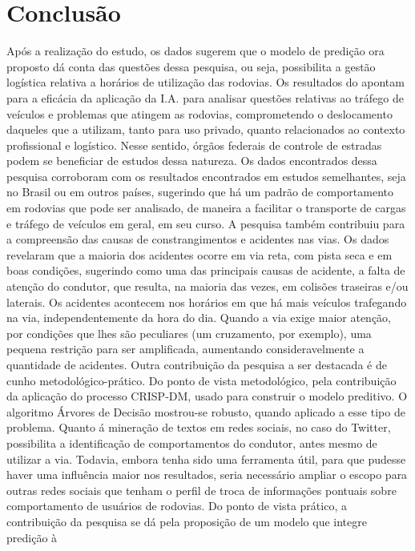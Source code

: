 \chapter{Conclusão}\label{intro:resumen}

Após a realização do estudo, os dados sugerem que o modelo de predição ora proposto dá conta das questões dessa pesquisa, ou seja, possibilita a gestão logística relativa a horários de utilização das rodovias.  Os resultados do apontam para a eficácia da aplicação da
I.A. para analisar questões relativas ao tráfego de veículos e
problemas que atingem as rodovias, comprometendo o
deslocamento daqueles que a utilizam, tanto para uso privado,
quanto relacionados ao contexto profissional e logístico. Nesse
sentido, órgãos federais de controle de estradas podem se
beneficiar de estudos dessa natureza. 
Os dados encontrados dessa pesquisa corroboram com os resultados encontrados em estudos semelhantes, seja no Brasil ou em outros países, sugerindo que há um padrão de
comportamento em rodovias que pode ser analisado, de
maneira a facilitar o transporte de cargas e tráfego de veículos em geral, em seu curso. 
A pesquisa também contribuiu para a compreensão das causas de constrangimentos e acidentes nas vias. Os dados revelaram que a maioria dos acidentes ocorre em via reta, com pista seca e em boas condições, sugerindo como uma das principais causas de acidente, a falta de atenção do condutor, que resulta, na maioria das vezes, em colisões traseiras e/ou laterais.
Os acidentes acontecem nos horários em que há mais veículos trafegando na via, independentemente da hora do dia. Quando a via exige maior atenção, por condições que lhes são peculiares (um cruzamento, por exemplo), uma pequena restrição para ser amplificada, aumentando consideravelmente a quantidade de acidentes.
Outra contribuição da pesquisa a ser destacada é de
cunho metodológico-prático. Do ponto de vista metodológico, pela contribuição da aplicação do processo CRISP-DM,
usado para construir o modelo preditivo. 
O algoritmo Árvores de Decisão mostrou-se robusto, quando aplicado a esse tipo de problema.
Quanto á mineração de textos em redes sociais, no caso do Twitter, possibilita a identificação de comportamentos do condutor, antes mesmo de utilizar a via. Todavia, embora tenha sido uma ferramenta útil, para que pudesse haver uma influência maior nos resultados, seria necessário ampliar o escopo para outras redes sociais que tenham o perfil de troca de informações pontuais sobre comportamento de usuários de rodovias.
Do ponto de vista prático, a contribuição da pesquisa se dá pela proposição de um modelo que integre predição à
